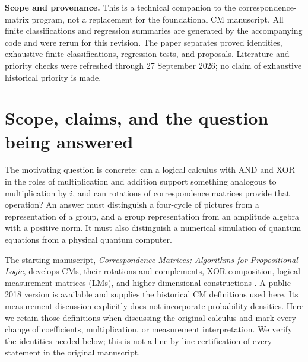 \begin{titlepage}
\begin{minipage}{0.91\textwidth}
\begin{abstract}
The successful phase construction changes scalars.  Lifting to $\Z[C_4]$ and quotienting by $1+g^2$ gives $\Z[i]$ and the explicit intertwining relation $QP=JQ$, together with an exact carry/overlap formula measuring the failure of XOR to become signed addition.  These identities provide a typed route from predicate CMs to reversible or phase oracles and a CM-visible realization of standard exact Clifford+$T$ arithmetic.  The Clifford+$T$ coefficient ring, Boolean path-sum semantics, and general matrix-logic ideas are established prior art; they are used here as comparison targets, not claimed as new.  The contribution is therefore a correction-oriented translation and boundary analysis, plus reproducible finite classifications, rather than a new quantum theory, a new exact-synthesis algorithm, or a simulation speedup.
\end{abstract}
\end{minipage}
\vfill
\begin{minipage}{0.91\textwidth}\small
\textbf{Scope and provenance.} This is a technical companion to the correspondence-matrix program, not a replacement for the foundational CM manuscript.  All finite classifications and regression summaries are generated by the accompanying code and were rerun for this revision.  The paper separates proved identities, exhaustive finite classifications, regression tests, and proposals.  Literature and priority checks were refreshed through 27 September 2026; no claim of exhaustive historical priority is made.
\end{minipage}
\end{titlepage}
\tableofcontents
\clearpage
\section{Scope, claims, and the question being answered}\label{sec:scope}
The motivating question is concrete: can a logical calculus with AND and XOR in the roles of multiplication and addition support something analogous to multiplication by $i$, and can rotations of correspondence matrices provide that operation? An answer must distinguish a four-cycle of pictures from a representation of a group, and a group representation from an amplitude algebra with a positive norm. It must also distinguish a numerical simulation of quantum equations from a physical quantum computer.

The starting manuscript, \emph{Correspondence Matrices; Algorithms for Propositional Logic}, develops CMs, their rotations and complements, XOR composition, logical measurement matrices (LMs), and higher-dimensional constructions \cite{droncheff}. A public 2018 version is available and supplies the historical CM definitions used here. Its measurement discussion explicitly does not incorporate probability densities. Here we retain those definitions when discussing the original calculus and mark every change of coefficients, multiplication, or measurement interpretation. We verify the identities needed below; this is not a line-by-line certification of every statement in the original manuscript.

